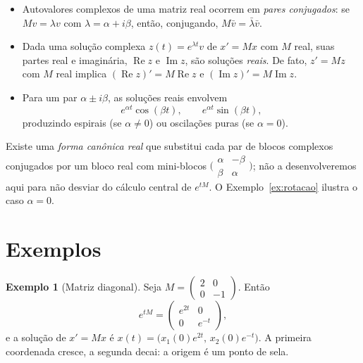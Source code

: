 \documentclass[11pt,a4paper]{amsart}
\theoremstyle{plain}
\theoremstyle{definition}
\newtheorem{exemplo}[teorema]{Exemplo}
\theoremstyle{remark}
\begin{document}
\begin{itemize}[leftmargin=1.4em]
  \item Autovalores complexos de uma matriz real ocorrem em \emph{pares
        conjugados}: se $Mv=\lambda v$ com $\lambda=\alpha+i\beta$, ent\~ao,
        conjugando, $M\bar v=\bar\lambda\bar v$.
  \item Dada uma solu\c{c}\~ao complexa $z(t)=e^{\lambda t}v$ de $x'=Mx$ com $M$
        real, suas partes real e imagin\'aria, $\operatorname{Re}z$ e
        $\operatorname{Im}z$, s\~ao solu\c{c}\~oes \emph{reais}. De fato,
        $z'=Mz$ com $M$ real implica $(\operatorname{Re}z)'=M\operatorname{Re}z$
        e $(\operatorname{Im}z)'=M\operatorname{Im}z$.
  \item Para um par $\alpha\pm i\beta$, as solu\c{c}\~oes reais envolvem
        \[
          e^{\alpha t}\cos(\beta t), \qquad e^{\alpha t}\sin(\beta t),
        \]
        produzindo espirais (se $\alpha\neq0$) ou oscila\c{c}\~oes puras (se
        $\alpha=0$).
\end{itemize}
Existe uma \emph{forma can\^onica real} que substitui cada par de blocos
complexos conjugados por um bloco real com mini-blocos
$\big(\begin{smallmatrix}\alpha&-\beta\\ \beta&\alpha\end{smallmatrix}\big)$;
n\~ao a desenvolveremos aqui para n\~ao desviar do c\'alculo central de
$e^{tM}$. O Exemplo~\ref{ex:rotacao} ilustra o caso $\alpha=0$.

\section{Exemplos}
\label{sec:exemplos}

\begin{exemplo}[Matriz diagonal]
Seja $M=\begin{pmatrix}2&0\\0&-1\end{pmatrix}$. Ent\~ao
\[
  e^{tM}=\begin{pmatrix}e^{2t}&0\\0&e^{-t}\end{pmatrix},
\]
e a solu\c{c}\~ao de $x'=Mx$ \'e
$x(t)=\big(x_1(0)e^{2t},\,x_2(0)e^{-t}\big)$. A primeira coordenada cresce, a
segunda decai: a origem \'e um ponto de sela.
\end{exemplo}
\end{document}

